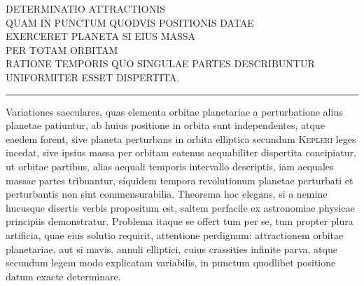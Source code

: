 \clearpage{}
{\small\begin{center}
DETERMINATIO ATTRACTIONIS\\
QUAM IN PUNCTUM QUODVIS POSITIONIS DATAE\\
EXERCERET PLANETA SI EIUS MASSA\\
PER TOTAM ORBITAM\\
RATIONE TEMPORIS QUO SINGULAE PARTES DESCRIBUNTUR\\
UNIFORMITER ESSET DISPERTITA.
\end{center}}

\begin{center}\rule{2cm}{0.3pt}\end{center}
Variationes saeculares, quas elementa orbitae planetariae a perturbatione
alius planetae patiuntur, ab huius positione in orbita sunt independentes, atque
eaedem forent, sive planeta perturbans in orbita elliptica secundum \textsc{Kepleri} leges
incedat, sive ipsius massa per orbitam eatenus aequabiliter dispertita concipiatur,
ut orbitae partibus, alias aequali temporis intervallo descriptis, iam aequales massae partes tribuantur, siquidem tempora revolutionum planetae perturbati et perturbantis non sint commensurabilia. Theorema hoc elegans, si a nemine hucusque disertis verbis propositum est, saltem perfacile ex astronomiae physicae principiis demonstratur. Problema itaque se offert tum per se, tum propter plura artificia, quae eius solutio requirit, attentione perdignum: attractionem orbitae planetariae, aut si mavis. annuli elliptici, cuius crassities infinite parva, atque secundum legem modo explicatam variabilis, in punctum quodlibet positione datum
exacte determinare.

